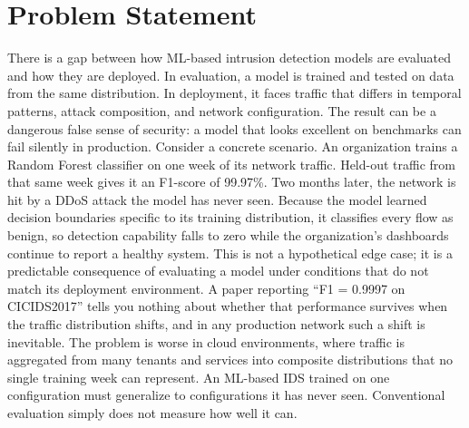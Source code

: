 \documentclass[10pt]{article}
\begin{document}
\section{Problem Statement}
There is a gap between how ML-based intrusion detection models are evaluated and how they are deployed. In evaluation, a model is trained and tested on data from the same distribution. In deployment, it faces traffic that differs in temporal patterns, attack composition, and network configuration. The result can be a dangerous false sense of security: a model that looks excellent on benchmarks can fail silently in production.
Consider a concrete scenario. An organization trains a Random Forest classifier on one week of its network traffic. Held-out traffic from that same week gives it an F1-score of 99.97\%. Two months later, the network is hit by a DDoS attack the model has never seen. Because the model learned decision boundaries specific to its training distribution, it classifies every flow as benign, so detection capability falls to zero while the organization's dashboards continue to report a healthy system.
This is not a hypothetical edge case; it is a predictable consequence of evaluating a model under conditions that do not match its deployment environment. A paper reporting ``F1 = 0.9997 on CICIDS2017'' tells you nothing about whether that performance survives when the traffic distribution shifts, and in any production network such a shift is inevitable. The problem is worse in cloud environments, where traffic is aggregated from many tenants and services into composite distributions that no single training week can represent. An ML-based IDS trained on one configuration must generalize to configurations it has never seen. Conventional evaluation simply does not measure how well it can.
\end{document}
